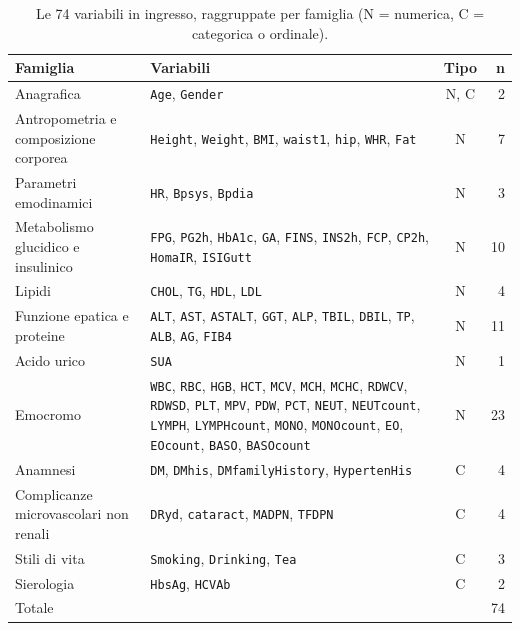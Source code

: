 \documentclass[a4paper, 12pt, oneside]{book}
\begin{document}
\begin{table}[H]
	\centering
	\small
	\caption{Le 74 variabili in ingresso, raggruppate per famiglia (N = numerica, C = categorica o ordinale).}
	\label{tab:variabili}
	\begin{tabularx}{\textwidth}{@{}l >{\raggedright\arraybackslash}X c r@{}}
		\toprule
		Famiglia & Variabili & Tipo & n \\
		\midrule
		Anagrafica & \texttt{Age}, \texttt{Gender} & N, C & 2 \\
		Antropometria e composizione corporea & \texttt{Height}, \texttt{Weight}, \texttt{BMI}, \texttt{waist1}, \texttt{hip}, \texttt{WHR}, \texttt{Fat} & N & 7 \\
		Parametri emodinamici & \texttt{HR}, \texttt{Bpsys}, \texttt{Bpdia} & N & 3 \\
		Metabolismo glucidico e insulinico & \texttt{FPG}, \texttt{PG2h}, \texttt{HbA1c}, \texttt{GA}, \texttt{FINS}, \texttt{INS2h}, \texttt{FCP}, \texttt{CP2h}, \texttt{HomaIR}, \texttt{ISIGutt} & N & 10 \\
		Lipidi & \texttt{CHOL}, \texttt{TG}, \texttt{HDL}, \texttt{LDL} & N & 4 \\
		Funzione epatica e proteine & \texttt{ALT}, \texttt{AST}, \texttt{ASTALT}, \texttt{GGT}, \texttt{ALP}, \texttt{TBIL}, \texttt{DBIL}, \texttt{TP}, \texttt{ALB}, \texttt{AG}, \texttt{FIB4} & N & 11 \\
		Acido urico & \texttt{SUA} & N & 1 \\
		Emocromo & \texttt{WBC}, \texttt{RBC}, \texttt{HGB}, \texttt{HCT}, \texttt{MCV}, \texttt{MCH}, \texttt{MCHC}, \texttt{RDWCV}, \texttt{RDWSD}, \texttt{PLT}, \texttt{MPV}, \texttt{PDW}, \texttt{PCT}, \texttt{NEUT}, \texttt{NEUTcount}, \texttt{LYMPH}, \texttt{LYMPHcount}, \texttt{MONO}, \texttt{MONOcount}, \texttt{EO}, \texttt{EOcount}, \texttt{BASO}, \texttt{BASOcount} & N & 23 \\
		Anamnesi & \texttt{DM}, \texttt{DMhis}, \texttt{DMfamilyHistory}, \texttt{HypertenHis} & C & 4 \\
		Complicanze microvascolari non renali & \texttt{DRyd}, \texttt{cataract}, \texttt{MADPN}, \texttt{TFDPN} & C & 4 \\
		Stili di vita & \texttt{Smoking}, \texttt{Drinking}, \texttt{Tea} & C & 3 \\
		Sierologia & \texttt{HbsAg}, \texttt{HCVAb} & C & 2 \\
		\midrule
		Totale & & & 74 \\
		\bottomrule
	\end{tabularx}
\end{table}
\end{document}
